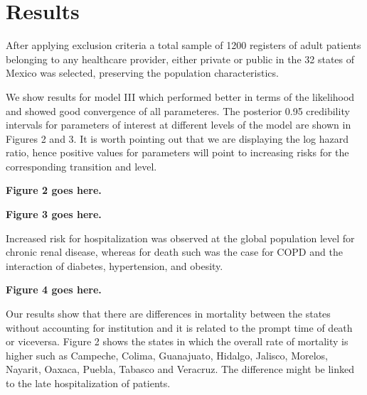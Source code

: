 \documentclass[10pt,letterpaper]{article}
\begin{document}
\hypertarget{results}{%
\section{Results}\label{results}}

After applying exclusion criteria a total sample of 1200 registers of
adult patients belonging to any healthcare provider, either private or
public in the 32 states of Mexico was selected, preserving the
population characteristics.

We show results for model III which performed better in terms of the
likelihood and showed good convergence of all parameteres. The posterior
0.95 credibility intervals for parameters of interest at different
levels of the model are shown in Figures 2 and 3. It is worth pointing
out that we are displaying the log hazard ratio, hence positive values
for parameters will point to increasing risks for the corresponding
transition and level.

\vspace{5mm}

\begin{center}
\textbf{Figure 2 goes here.}
\end{center}

\vspace{5mm}

\begin{center}
\textbf{Figure 3 goes here.}
\end{center}

\vspace{5mm}

Increased risk for hospitalization was observed at the global population
level for chronic renal disease, whereas for death such was the case for
COPD and the interaction of diabetes, hypertension, and obesity.

\vspace{5mm}

\begin{center}
\textbf{Figure 4 goes here.}
\end{center}

\vspace{5mm}

Our results show that there are differences in mortality between the
states without accounting for institution and it is related to the
prompt time of death or viceversa. Figure 2 shows the states in which
the overall rate of mortality is higher such as Campeche, Colima,
Guanajuato, Hidalgo, Jalisco, Morelos, Nayarit, Oaxaca, Puebla, Tabasco
and Veracruz. The difference might be linked to the late hospitalization
of patients.
\end{document}
